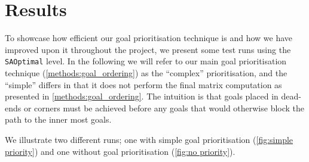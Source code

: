 \section{Results}
\label{sec:results}


To showcase how efficient our goal prioritisation technique is and how we have improved upon it throughout the project, we present some test runs using the \texttt{SAOptimal} level.
In the following we will refer to our main goal prioritisation technique (\cref{methods:goal_ordering}) as the ``complex'' prioritisation, and the ``simple'' differs in that it does not perform the final matrix computation as presented in \cref{methods:goal_ordering}.
The intuition is that goals placed in dead-ends or corners must be achieved before any goals that would otherwise block the path to the inner most goals.

We illustrate two different runs; one with simple goal prioritisation (\cref{fig:simple priority}) and one without goal prioritisation (\cref{fig:no priority}).

